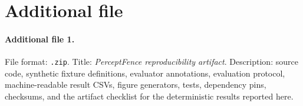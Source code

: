 \documentclass[pdflatex,sn-mathphys-num]{sn-jnl}
\begin{document}
\section*{Additional file}

\paragraph{Additional file 1.}
File format: \texttt{.zip}. Title: \textit{PerceptFence reproducibility
artifact}. Description: source code, synthetic fixture definitions, evaluator
annotations, evaluation protocol, machine-readable result CSVs, figure
generators, tests, dependency pins, checksums, and the artifact checklist for
the deterministic results reported here.


\begingroup
\small

\endgroup
\end{document}

